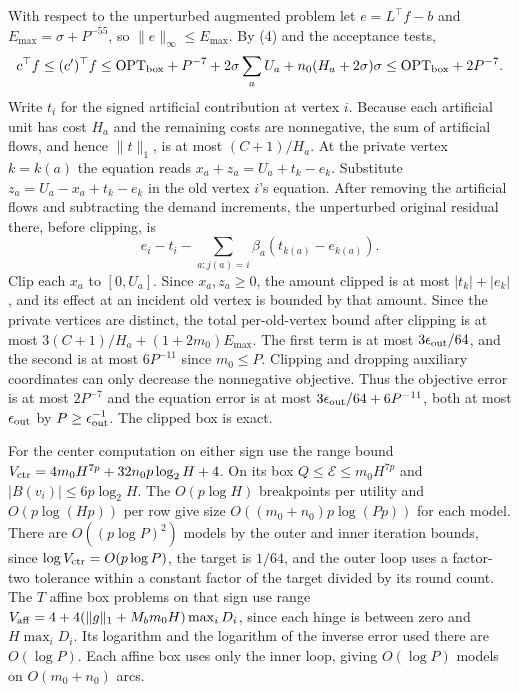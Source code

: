 \documentclass[11pt]{article}
\begin{document}
With respect to the unperturbed augmented problem let \(e=L^\top f-b\) and \(E_{\max}=\sigma+P^{-55}\), so \(\|e\|_\infty\le E_{\max}\). By (4) and the acceptance tests,
\[
 c^\top f\le(c')^\top f\le\mathrm{OPT}_{\rm box}+P^{-7}
                +2\sigma\sum_a U_a+n_0(H_a+2\sigma)\sigma
           \le\mathrm{OPT}_{\rm box}+2P^{-7}.
\]
Write \(t_i\) for the signed artificial contribution at vertex \(i\). Because each artificial unit has cost \(H_a\) and the remaining costs are nonnegative, the sum of artificial flows, and hence \(\|t\|_1\), is at most \((C+1)/H_a\). At the private vertex \(k=k(a)\) the equation reads \(x_a+z_a=U_a+t_k-e_k\). Substitute \(z_a=U_a-x_a+t_k-e_k\) in the old vertex \(i\)'s equation. After removing the artificial flows and subtracting the demand increments, the unperturbed original residual there, before clipping, is
\[
  e_i-t_i-\sum_{a:j(a)=i}\beta_a(t_{k(a)}-e_{k(a)}).
\]
Clip each \(x_a\) to \([0,U_a]\). Since \(x_a,z_a\ge0\), the amount clipped is at most \(|t_k|+|e_k|\), and its effect at an incident old vertex is bounded by that amount. Since the private vertices are distinct, the total per-old-vertex bound after clipping is at most \(3(C+1)/H_a+(1+2m_0)E_{\max}\). The first term is at most \(3\epsilon_{\rm out}/64\), and the second is at most \(6P^{-11}\) since \(m_0\le P\). Clipping and dropping auxiliary coordinates can only decrease the nonnegative objective. Thus the objective error is at most \(2P^{-7}\) and the equation error is at most \(3\epsilon_{\rm out}/64+6P^{-11}\), both at most \(\epsilon_{\rm out}\) by \(P\ge\epsilon_{\rm out}^{-1}\). The clipped box is exact.

For the center computation on either sign use the range bound \(V_{\rm ctr}=4m_0H^{7p}+32n_0p\log_2 H+4\). On its box \(Q\le\mathcal E\le m_0H^{7p}\) and \(|B(v_i)|\le6p\log_2H\). The \(O(p\log H)\) breakpoints per utility and \(O(p\log(Hp))\) per row give size \(O((m_0+n_0)p\log(Pp))\) for each model. There are \(O((p\log P)^2)\) models by the outer and inner iteration bounds, since \(\log V_{\rm ctr}=O(p\log P)\), the target is \(1/64\), and the outer loop uses a factor-two tolerance within a constant factor of the target divided by its round count. The \(T\) affine box problems on that sign use range \(V_{\rm aff}=4+4(\|g\|_1+M_bm_0H)\max_i D_i\), since each hinge is between zero and \(H\max_i D_i\). Its logarithm and the logarithm of the inverse error used there are \(O(\log P)\). Each affine box uses only the inner loop, giving \(O(\log P)\) models on \(O(m_0+n_0)\) arcs.
\end{document}
